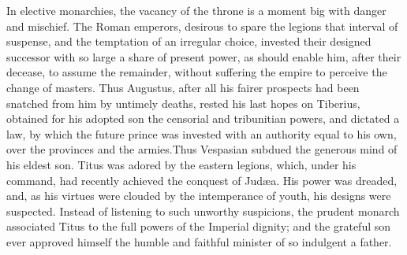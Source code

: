 
In elective monarchies, the vacancy of the throne is a moment big
with danger and mischief. The Roman emperors, desirous to spare
the legions that interval of suspense, and the temptation of an
irregular choice, invested their designed successor with so large
a share of present power, as should enable him, after their
decease, to assume the remainder, without suffering the empire to
perceive the change of masters. Thus Augustus, after all his
fairer prospects had been snatched from him by untimely deaths,
rested his last hopes on Tiberius, obtained for his adopted son
the censorial and tribunitian powers, and dictated a law, by
which the future prince was invested with an authority equal to
his own, over the provinces and the armies.\footnotemark[32] Thus Vespasian
subdued the generous mind of his eldest son. Titus was adored by
the eastern legions, which, under his command, had recently
achieved the conquest of Judæa. His power was dreaded, and, as
his virtues were clouded by the intemperance of youth, his
designs were suspected. Instead of listening to such unworthy
suspicions, the prudent monarch associated Titus to the full
powers of the Imperial dignity; and the grateful son ever
approved himself the humble and faithful minister of so indulgent
a father.\footnotemark[33]



